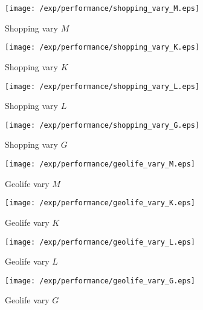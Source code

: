 \begin{figure*}[t]
\centering
    \begin{subfigure}[b]{0.23\textwidth}
        \texttt{[image: /exp/performance/shopping\_vary\_M.eps]}
        \caption{Shopping vary $M$}
    \end{subfigure}
    \begin{subfigure}[b]{0.23\textwidth}
        \texttt{[image: /exp/performance/shopping\_vary\_K.eps]}
        \caption{Shopping vary $K$}
    \end{subfigure}
    \begin{subfigure}[b]{0.23\textwidth}
        \texttt{[image: /exp/performance/shopping\_vary\_L.eps]}
        \caption{Shopping vary $L$}
    \end{subfigure}
       \begin{subfigure}[b]{0.23\textwidth}
        \texttt{[image: /exp/performance/shopping\_vary\_G.eps]}
        \caption{Shopping vary $G$}
    \end{subfigure}

	\begin{subfigure}[b]{0.23\textwidth}
        \texttt{[image: /exp/performance/geolife\_vary\_M.eps]}
        \caption{Geolife vary $M$}
    \end{subfigure}
    \begin{subfigure}[b]{0.23\textwidth}
        \texttt{[image: /exp/performance/geolife\_vary\_K.eps]}
        \caption{Geolife vary $K$}
    \end{subfigure}
    \begin{subfigure}[b]{0.23\textwidth}
        \texttt{[image: /exp/performance/geolife\_vary\_L.eps]}
        \caption{Geolife vary $L$}
    \end{subfigure}
       \begin{subfigure}[b]{0.23\textwidth}
        \texttt{[image: /exp/performance/geolife\_vary\_G.eps]}
        \caption{Geolife vary $G$}
    \end{subfigure}
    

\end{figure*}

